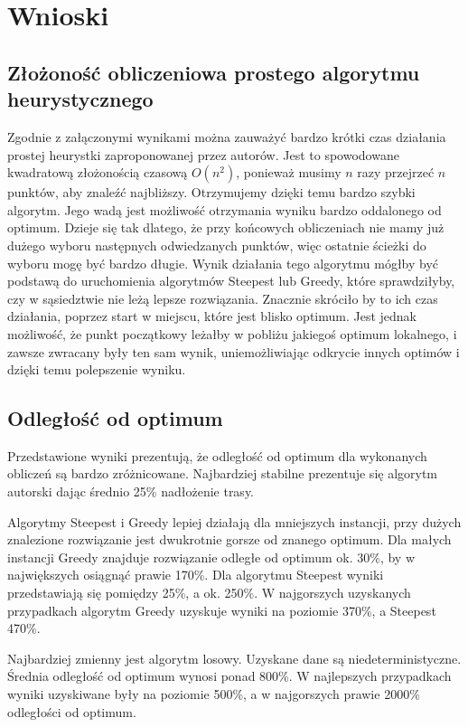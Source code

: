 \section{Wnioski}

\subsection{Złożoność obliczeniowa prostego algorytmu heurystycznego}

Zgodnie z załączonymi wynikami można zauważyć bardzo krótki czas działania prostej
heurystki zaproponowanej przez autorów. Jest to spowodowane kwadratową złożonością 
czasową $ O(n^{2}) $, ponieważ musimy $ n $ razy przejrzeć $ n $ punktów, aby znaleźć
najbliższy. Otrzymujemy dzięki temu bardzo szybki algorytm. Jego wadą jest 
możliwość otrzymania wyniku bardzo oddalonego od optimum. Dzieje się tak dlatego, 
że przy końcowych obliczeniach nie mamy już dużego wyboru następnych odwiedzanych 
punktów, więc ostatnie ścieżki do wyboru mogę być bardzo długie. Wynik działania 
tego algorytmu mógłby być podstawą do uruchomienia algorytmów Steepest lub Greedy, 
które sprawdziłyby, czy w sąsiedztwie nie leżą lepsze rozwiązania. Znacznie skróciło
by to ich czas działania, poprzez start w miejscu, które jest blisko optimum.
Jest jednak możliwość, że punkt początkowy leżałby w pobliżu jakiegoś optimum 
lokalnego, i zawsze zwracany były ten sam wynik, uniemożliwiając odkrycie innych 
optimów i dzięki temu polepszenie wyniku.

\subsection{Odległość od optimum}

Przedstawione wyniki prezentują, że odległość od optimum dla wykonanych obliczeń 
są bardzo zróżnicowane. Najbardziej stabilne prezentuje się algorytm autorski 
dając średnio 25\% nadłożenie trasy. 

Algorytmy Steepest i Greedy lepiej działają dla mniejszych instancji, przy dużych 
znalezione rozwiązanie jest dwukrotnie gorsze od znanego optimum. Dla małych instancji
Greedy znajduje rozwiązanie odległe od optimum ok. 30\%, by w największych osiągnąć 
prawie 170\%. Dla algorytmu Steepest wyniki przedstawiają się pomiędzy 25\%, a ok. 250\%.
W najgorszych uzyskanych przypadkach algorytm Greedy uzyskuje wyniki na poziomie 370\%, 
a Steepest 470\%.

Najbardziej zmienny jest algorytm losowy. Uzyskane dane są niedeterministyczne. Średnia
odległość od optimum wynosi ponad 800\%. W najlepszych przypadkach wyniki uzyskiwane były
na poziomie 500\%, a w najgorszych prawie 2000\% odległości od optimum.

